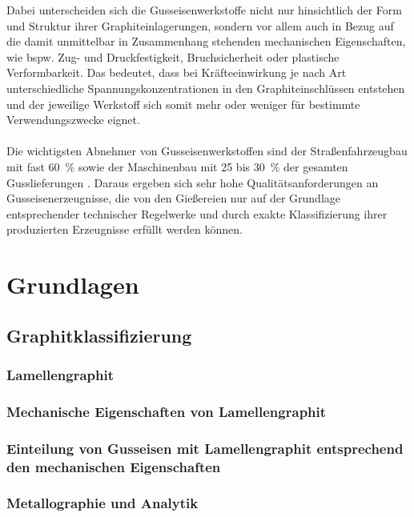 \documentclass[
fontsize=10pt, 
listof = totoc,
parskip = half	
]{report}
\begin{document}
\noindent Dabei unterscheiden sich die Gusseisenwerkstoffe nicht nur hinsichtlich der Form und Struktur ihrer Graphiteinlagerungen, sondern vor allem auch in Bezug auf die damit unmittelbar in Zusammenhang stehenden mechanischen Eigenschaften, wie bspw. Zug- und Druckfestigkeit, Bruchsicherheit oder plastische Verformbarkeit. Das bedeutet, dass bei Kräfteeinwirkung je nach Art unterschiedliche Spannungskonzentrationen in den Graphiteinschlüssen entstehen und der jeweilige Werkstoff sich somit mehr oder weniger für bestimmte Verwendungszwecke eignet.
\\\\
\noindent Die wichtigsten Abnehmer von Gusseisenwerkstoffen sind der Straßenfahrzeugbau mit fast 60~\% sowie der Maschinenbau mit 25 bis 30~\% der gesamten Gusslieferungen \cite{BDGuss01}. Daraus ergeben sich sehr hohe Qualitätsanforderungen an Gusseisenerzeugnisse, die von den Gießereien nur auf der Grundlage entsprechender technischer Regelwerke und durch exakte Klassifizierung ihrer produzierten Erzeugnisse erfüllt werden können. 



\chapter{Grundlagen}
\label{ch:Grundlagen}

\section{Graphitklassifizierung}
\label{sec:Graphitklassifizierung}

\subsection{Lamellengraphit}
\label{subsec:Lamellengraphit}

\subsection{Mechanische Eigenschaften von Lamellengraphit}
\label{subsec:MechanischeEigenschaften}

\subsection{Einteilung von Gusseisen mit Lamellengraphit entsprechend den mechanischen Eigenschaften}
\label{subsec:EinteilungLamellengraphit}

\subsection{Metallographie und Analytik}
\label{sec:MetallographieAnalytik}
\end{document}
